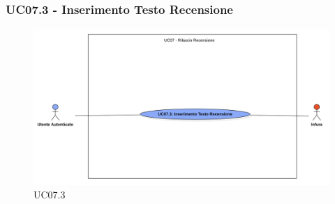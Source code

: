             \subsubsection{UC07.3 - Inserimento Testo Recensione}
            \label{UC07.3}

                \begin{figure}[H]
                    \centering
                    \includegraphics[scale=0.4]{src/img/UC07.3.png}
                    \caption{UC07.3}
                \end{figure}

